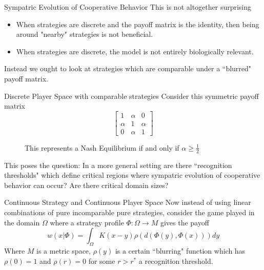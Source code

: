 \documentclass{beamer}
\begin{document}
\begin{frame}{Sympatric Evolution of Cooperative Behavior}
	This is not altogether surprising
	\begin{itemize}
		\item When strategies are discrete and the payoff matrix is the identity, then being around "nearby" strategies is not beneficial. 
		\item When strategies are discrete, the model is not entirely biologically relevant. 
	\end{itemize}
	Instead we ought to look at strategies which are comparable under a ``blurred" payoff matrix. 
\end{frame}

\begin{frame}{Discrete Player Space with comparable strategies}
	Consider this symmetric payoff matrix
	\begin{equation}
		\begin{bmatrix}
			1&\alpha&0\\
			\alpha&1&\alpha\\
			0&\alpha&1
		\end{bmatrix}
	\end{equation}
	\begin{figure} 
	\caption{This represents a Nash Equilibrium if and only if $\alpha\geq \frac{1}{2}$}
\end{figure}	
	This poses the question: In a more general setting are there ``recognition thresholds" which define critical regions where sympatric evolution of cooperative behavior can occur? Are there critical domain sizes?   
\end{frame}
	
\begin{frame}{Continuous Strategy and Continuous Player Space}
	Now instead of using linear combinations of pure incomparable pure strategies, consider the game played in the domain $\Omega$ where a strategy profile $\Phi:\Omega \rightarrow M$ gives the payoff
	\begin{equation}
		w(x|\Phi)= \int_\Omega K(x-y)\rho(d(\Phi(y),\Phi(x)))dy
	\end{equation}
	Where $M$ is a metric space, $\rho(y)$ is a certain ``blurring" function which has $\rho (0)=1$ and $\rho(r)=0$ for some $r>r^*$ a recognition threshold. 
\end{frame}
\end{document}
